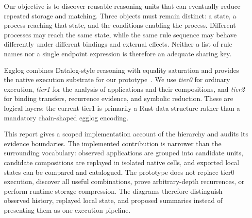 \documentclass[11pt,a4paper]{article}
\begin{document}
Our objective is to discover reusable reasoning units that can eventually reduce
repeated storage and matching. Three objects must remain distinct: a state, a
process reaching that state, and the conditions enabling the process. Different
processes may reach the same state, while the same rule sequence may behave
differently under different bindings and external effects. Neither a list of rule
names nor a single endpoint expression is therefore an adequate sharing key.

Egglog combines Datalog-style reasoning with equality saturation and provides the
native execution substrate for our prototype~\cite{egglog}. We use \emph{tier0}
for ordinary execution, \emph{tier1} for the analysis of applications and their
compositions, and \emph{tier2} for binding transfers, recurrence evidence, and
symbolic reduction. These are logical layers: the current tier1 is primarily a
Rust data structure rather than a mandatory chain-shaped egglog encoding.

This report gives a scoped implementation account of the hierarchy and audits its
evidence boundaries. The implemented contribution is narrower than the surrounding
vocabulary: observed applications are grouped into candidate units, candidate
compositions are replayed in isolated native cells, and exported local states can be
compared and catalogued. The prototype does not replace tier0 execution, discover all
useful combinations, prove arbitrary-depth recurrences, or perform runtime storage
compression. The diagrams therefore distinguish observed history, replayed local
state, and proposed summaries instead of presenting them as one execution pipeline.
\end{document}
